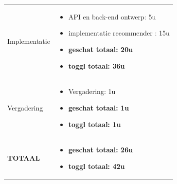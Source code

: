 \documentclass{article}
\begin{document}
\begin{center}
\begin{tabularx}{\textwidth}[t]{XX}
\arrayrulecolor{black}\hline


\vspace{1 mm}
Implementatie & 
\begin{minipage}[t]{\linewidth}%
\vspace{1 mm}
\begin{itemize}
\item API en back-end ontwerp: 5u
\item implementatie recommender : 15u 
\item \textbf{geschat totaal: 20u}
\item \textbf{toggl totaal: 36u}
\end{itemize} 
\vspace{1 mm}
\end{minipage}\\


\arrayrulecolor{black}\hline

\vspace{2 mm}
Vergadering & 
\begin{minipage}[t]{\linewidth}%
\vspace{2 mm}
\begin{itemize}
\item Vergadering: 1u
\item \textbf{geschat totaal: 1u}
\item \textbf{toggl totaal: 1u}
\vspace{2 mm}
\end{itemize} 
\end{minipage}\\

\arrayrulecolor{black}\hline

\vspace{2 mm}
\textbf{TOTAAL} & 
\begin{minipage}[t]{\linewidth}%
\vspace{2 mm}
\begin{itemize}
\item \textbf{geschat totaal: 26u}
\item \textbf{toggl totaal: 42u}
\vspace{2 mm}
\end{itemize} 
\end{minipage}\\

\end{tabularx}
\end{center}


\end{document}

